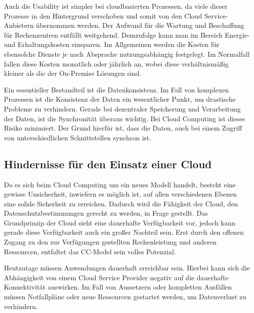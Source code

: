 Auch die Usability ist simpler bei cloudbasierten Prozessen, da viele dieser Prozesse in den Hintergrund verschoben und somit von den Cloud Service-Anbietern übernommen werden. Der Aufwand für die  Wartung und Beschaffung für Rechenzentren entfällt weitgehend. Demzufolge kann man im Bereich Energie- und Erhaltungskosten einsparen. Im Allgemeinen werden die Kosten für ebensolche Dienste je nach Absprache nutzungsabhängig festgelegt. Im Normalfall fallen diese Kosten monatlich oder jährlich an, wobei diese verhältnismäßig kleiner als die der On-Premise Lösungen sind.

Ein essentieller Bestandteil ist die Datenkonsistenz. Im Fall von komplexen Prozessen ist die Konsistenz der Daten ein wesentlicher Punkt, um drastische Probleme zu verhindern. Gerade bei dezentraler Speicherung und Verarbeitung der Daten, ist die Synchronität überaus wichtig. Bei Cloud Computing ist dieses Risiko minimiert. Der Grund hierfür ist, dass die Daten, auch bei einem Zugriff von unterschiedlichen Schnittstellen synchron ist. 

\subsection{Hindernisse für den Einsatz einer Cloud}

Da es sich beim Cloud Computing um ein neues Modell handelt, besteht eine gewisse Unsicherheit, inwiefern es möglich ist, auf allen verschiedenen Ebenen eine solide Sicherheit zu erreichen. Dadurch wird die Fähigkeit der Cloud, den Datenschutzbestimmungen gerecht zu werden, in Frage gestellt. Das Grundprinzip der Cloud sieht eine dauerhafte Verfügbarkeit vor, jedoch kann gerade diese Verfügbarkeit auch ein großer Nachteil sein. Erst durch den offenen Zugang zu den zur Verfügungen gestellten Rechenleistung und anderen Ressourcen, entfaltet das CC-Model sein volles Potenzial. 

Heutzutage müssen Anwendungen dauerhaft erreichbar sein. Hierbei kann sich die Abhängigkeit von einem Cloud Service Provider negativ auf die dauerhafte Konnektivität auswirken. Im Fall von Aussetzern oder kompletten Ausfällen müssen Notfallpläne oder neue Ressourcen gestartet werden, um Datenverlust zu verhindern. 

